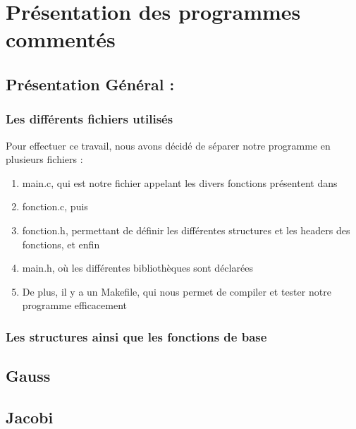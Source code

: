 \documentclass[letter]{article}
\begin{document}
\section{Présentation des programmes commentés}
\label{sec:orgea98326}

\subsection{Présentation Général :}
\label{sec:org5d682d9}

\subsubsection{Les différents fichiers utilisés}
\label{sec:orgbc71862}
Pour effectuer ce travail, nous avons décidé de séparer notre programme en plusieurs fichiers : 

\begin{enumerate}
\item main.c, qui est notre fichier appelant les divers fonctions présentent dans
\item fonction.c, puis
\item fonction.h, permettant de définir les différentes structures et les headers des fonctions, et enfin
\item main.h, où les différentes bibliothèques sont déclarées
\item De plus, il y a un Makefile, qui nous permet de compiler et tester notre programme efficacement
\end{enumerate}







\subsubsection{Les structures ainsi que les fonctions de base}
\label{sec:org49241fc}

\subsection{Gauss}
\label{sec:orgb6479e6}

\subsection{Jacobi}
\label{sec:org445e857}
\end{document}
